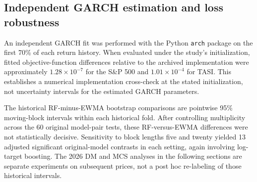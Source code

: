\subsection{Independent GARCH estimation and loss robustness}
An independent GARCH fit was performed with the Python \texttt{arch} package on the first 70\% of each return history. When evaluated under the study's initialization, fitted objective-function differences relative to the archived implementation were approximately $1.28\times10^{-7}$ for the S\&P 500 and $1.01\times10^{-4}$ for TASI. This establishes a numerical implementation cross-check at the stated initialization, not uncertainty intervals for the estimated GARCH parameters.

The historical RF-minus-EWMA bootstrap comparisons are pointwise 95\% moving-block intervals within each historical fold. After controlling multiplicity across the 60 original model-pair tests, these RF-versus-EWMA differences were not statistically decisive. Sensitivity to block lengths five and twenty yielded 13 adjusted significant original-model contrasts in each setting, again involving log-target boosting. The 2026 DM and MCS analyses in the following sections are separate experiments on subsequent prices, not a post hoc re-labeling of those historical intervals.

